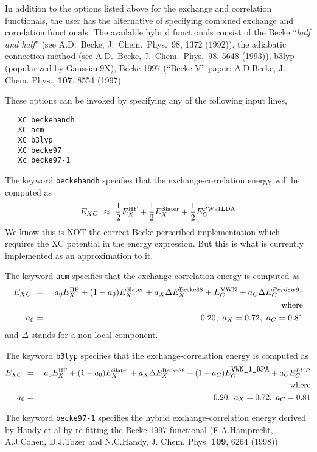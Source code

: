 In addition to the options listed above for the exchange and correlation
functionals, the user has the alternative of specifying combined exchange and 
correlation functionals.
  The available hybrid functionals consist of the Becke
``{\sl half and half}'' (see A.D.~Becke, J.~Chem.~Phys.~98, 1372 (1992)), the
adiabatic connection method (see A.D.~Becke, J.~Chem.~Phys.~98, 5648
(1993)),  b3lyp (popularized by Gaussian9X), Becke 1997 (``Becke V'' paper: A.D.Becke, J. Chem. Phys., {\bf 107}, 8554 (1997)

These options can be invoked by specifying any of the following input lines,
\begin{verbatim}
   XC beckehandh
   XC acm
   XC b3lyp
   XC becke97
   Xc becke97-1
\end{verbatim}

The keyword \verb+beckehandh+ specifies that the exchange-correlation energy will be
computed as 
\begin{eqnarray*}
E_{XC} \ \approx \ \frac{1}{2} E^{\rm HF}_X + \frac{1}{2} E^{\rm
  Slater}_{X} + \frac{1}{2} E^{\rm PW91LDA}_{C}
\end{eqnarray*}
We know this is NOT the correct Becke perscribed implementation which
requires the XC potential in the energy expression.  But this is what
is currently implemented as an approximation to it.

\clearpage


The keyword \verb+acm+ specifies that the exchange-correlation energy
is computed as
\begin{eqnarray*}
E_{XC} \ &=& \ a_0 E^{\rm HF}_X + (1-a_0) E^{\rm Slater}_{X} +
a_X \Delta E^{\rm Becke88}_{X} + E^{\rm VWN}_C + a_C \Delta E^{Perdew91}_C \\
& &{\rm where } \\
a_0 &=& 0.20, \ a_X = 0.72, \ a_C = 0.81
\end{eqnarray*}
and $\Delta$ stands for a non-local component.


The keyword \verb+b3lyp+ specifies that the exchange-correlation energy
is computed as
\begin{eqnarray*}
E_{XC} \ &=& \ a_0 E^{\rm HF}_X + (1-a_0) E^{\rm Slater}_{X} +
a_X \Delta E^{\rm Becke88}_{X} + (1-a_C)E^{\rm \verb+VWN_1_RPA+}_C + a_C E^{LYP}_C \\
& &{\rm where } \\
a_0 &=& 0.20, \ a_X = 0.72, \ a_C = 0.81
\end{eqnarray*}


The keyword \verb+becke97-1+ specifies  the hybrid exchange-correlation energy
derived by Handy et al by re-fitting the Becke 1997 functional
(F.A.Hamprecht, A.J.Cohen, D.J.Tozer and N.C.Handy, 
    J. Chem. Phys. {\bf 109}, 6264 (1998))

